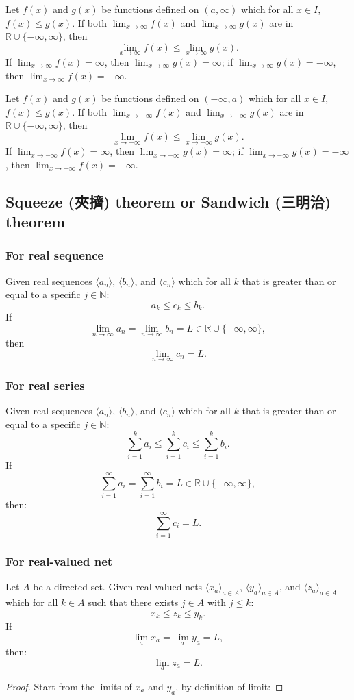 \documentclass[a4paper,12pt]{report}
\begin{document}
\begin{itemize}
\begin{itemize}
Let $f(x)$ and $g(x)$ be functions defined on $(a,\infty)$ which for all $x\in I$, $f(x)\leq g(x)$. If both $\lim_{x\to\infty}f(x)$ and $\lim_{x\to\infty}g(x)$ are in $\mathbb{R}\cup\{-\infty,\infty\}$, then
\[\lim_{x\to\infty}f(x)\leq\lim_{x\to\infty}g(x).\]
If $\lim_{x\to\infty}f(x)=\infty$, then $\lim_{x\to\infty}g(x)=\infty$; if $\lim_{x\to\infty}g(x)=-\infty$, then $\lim_{x\to\infty}f(x)=-\infty$.

Let $f(x)$ and $g(x)$ be functions defined on $(-\infty,a)$ which for all $x\in I$, $f(x)\leq g(x)$. If both $\lim_{x\to-\infty}f(x)$ and $\lim_{x\to-\infty}g(x)$ are in $\mathbb{R}\cup\{-\infty,\infty\}$, then
\[\lim_{x\to-\infty}f(x)\leq\lim_{x\to-\infty}g(x).\]
If $\lim_{x\to-\infty}f(x)=\infty$, then $\lim_{x\to-\infty}g(x)=\infty$; if $\lim_{x\to-\infty}g(x)=-\infty$, then $\lim_{x\to-\infty}f(x)=-\infty$.
\subsection{Squeeze (夾擠) theorem or Sandwich (三明治) theorem}
\subsubsection{For real sequence}
Given real sequences $\langle a_n\rangle$, $\langle b_n\rangle$, and $\langle c_n\rangle$ which for all $k$ that is greater than or equal to a specific $j\in \mathbb{N}$:
\[a_k\leq c_k\leq b_k.\]
If
\[\lim_{n\to\infty}a_n=\lim_{n\to\infty}b_n=L\in\mathbb{R}\cup\{-\infty,\infty\},\]
then
\[\lim_{n\to\infty}c_n=L.\]
\subsubsection{For real series}
Given real sequences $\langle a_n\rangle$, $\langle b_n\rangle$, and $\langle c_n\rangle$ which for all $k$ that is greater than or equal to a specific $j\in \mathbb{N}$:
\[\sum_{i=1}^ka_i\leq\sum_{i=1}^kc_i\leq\sum_{i=1}^kb_i.\]
If
\[\sum_{i=1}^{\infty}a_i=\sum_{i=1}^{\infty}b_i=L\in\mathbb{R}\cup\{-\infty,\infty\},\]
then: 
\[\sum_{i=1}^{\infty}c_i=L.\]
\subsubsection{For real-valued net}
Let $A$ be a directed set. Given real-valued nets $\langle x_a\rangle_{a\in A}$, $\langle y_a\rangle_{a\in A}$, and $\langle z_a\rangle_{a\in A}$ which for all $k\in A$ such that there exists $j\in A$ with $j\leq k$:
\[x_k\leq z_k\leq y_k.\]
If
\[\lim_{a}x_a=\lim_{a}y_a=L,\]
then: 
\[\lim_{a}z_a=L.\]
\begin{proof}
Start from the limits of $x_a$ and $y_a$, by definition of limit:


\end{proof}
\end{itemize}
\end{itemize}
\end{document}
